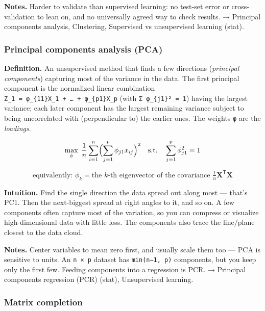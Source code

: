 \documentclass[
  10pt,
  letterpaper,
  onecolumn]{article}
\begin{document}
\textbf{Notes.} Harder to validate than supervised learning: no test-set
error or cross-validation to lean on, and no universally agreed way to
check results. → Principal components analysis, Clustering, Supervised
vs unsupervised learning (stat).

\hypertarget{principal-components-analysis-pca}{%
\subsubsection{Principal components analysis
(PCA)}\label{principal-components-analysis-pca}}

\textbf{Definition.} An unsupervised method that finds a few directions
(\emph{principal components}) capturing most of the variance in the
data. The first principal component is the normalized linear combination
\texttt{Z\_1\ =\ φ\_\{11\}X\_1\ +\ …\ +\ φ\_\{p1\}X\_p} (with
\texttt{Σ\ φ\_\{j1\}²\ =\ 1}) having the largest variance; each later
component has the largest remaining variance subject to being
uncorrelated with (perpendicular to) the earlier ones. The weights
\texttt{φ} are the \emph{loadings}.

\begin{equation*}
\max_{\phi}\;\frac{1}{n}\sum_{i=1}^{n}\Bigl(\sum_{j=1}^{p}\phi_{j1}x_{ij}\Bigr)^{2}
\quad\text{s.t.}\quad\sum_{j=1}^{p}\phi_{j1}^{2}=1
\end{equation*}

\begin{equation*}
\text{equivalently: } \phi_k=\text{the }k\text{-th eigenvector of the covariance }\tfrac{1}{n}\mathbf{X}^{\mathsf T}\mathbf{X}
\end{equation*}

\textbf{Intuition.} Find the single direction the data spread out along
most --- that's PC1. Then the next-biggest spread at right angles to it,
and so on. A few components often capture most of the variation, so you
can compress or visualize high-dimensional data with little loss. The
components also trace the line/plane closest to the data cloud.

\textbf{Notes.} Center variables to mean zero first, and usually scale
them too --- PCA is sensitive to units. An \texttt{n\ ×\ p} dataset has
\texttt{min(n−1,\ p)} components, but you keep only the first few.
Feeding components into a regression is PCR. → Principal components
regression (PCR) (stat), Unsupervised learning.

\hypertarget{matrix-completion}{%
\subsubsection{Matrix completion}\label{matrix-completion}}
\end{document}
